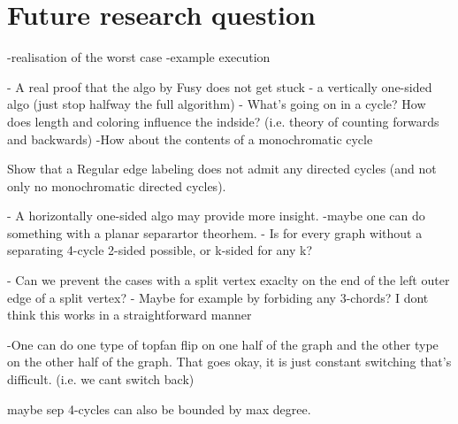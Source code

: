 \section{Future research question}

-realisation of the worst case
-example execution


- A real proof that the algo by Fusy does not get stuck
- a vertically one-sided algo (just stop halfway the full algorithm)
- What's going on in a cycle? How does length and coloring influence the indside? (i.e. theory of counting forwards and backwards)
  -How about the contents of a monochromatic cycle

Show that a Regular edge labeling does not admit any directed cycles (and not only no monochromatic directed cycles).

- A horizontally one-sided algo may provide more insight.
-maybe one can do something with a planar separartor theorhem.
- Is for every graph without a separating 4-cycle 2-sided possible, or k-sided for any k?

- Can we prevent the cases with a split vertex exaclty on the end of the left outer edge of a split vertex?
      - Maybe for example by forbiding any 3-chords? I dont think this works in a straightforward manner

-One can do one type of topfan flip on one half of the graph and the other type on the other half of the graph. That goes okay, it is just constant switching that's difficult. (i.e. we cant switch back)


maybe sep 4-cycles can also be bounded by max degree.
